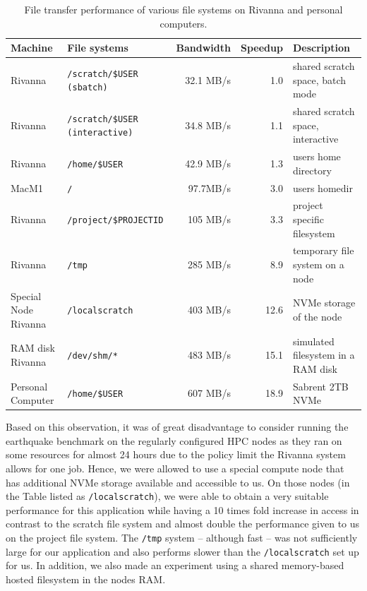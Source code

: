 \begin{table}
  \caption{File transfer performance of various file systems on Rivanna and personal computers.}
  \label{tab:file-performance}
  \begin{center}
 {\footnotesize 
    \begin{tabular}{|llrrp{4.5cm}|}
      \hline
    Machine & File systems & Bandwidth & Speedup & Description \\
    \hline
    \hline
    Rivanna & \verb|/scratch/$USER  (sbatch)|     &  32.1 MB/s  & 1.0 & shared scratch space, batch mode \\
    Rivanna & \verb|/scratch/$USER (interactive)| &  34.8 MB/s  & 1.1 & shared scratch space, interactive \\
    Rivanna & \verb|/home/$USER|                    & 42.9 MB/s  & 1.3 & users home directory \\
    MacM1   & \verb|/| &  97.7MB/s & 3.0 & users homedir \\
    Rivanna & \verb|/project/$PROJECTID |     &  105 MB/s  & 3.3 & project specific filesystem \\
    Rivanna & \verb|/tmp|                         &  285 MB/s  & 8.9 & temporary file system on a node \\
    Special Node Rivanna & \verb|/localscratch|  &  403 MB/s  & 12.6 & NVMe storage of the node\\
    RAM disk Rivanna  & \verb|/dev/shm/*|      &    483 MB/s  & 15.1 & simulated filesystem in a RAM disk\\
    Personal Computer & \verb|/home/$USER| &  607 MB/s &  18.9 & Sabrent 2TB NVMe\\
    \hline
    \end{tabular}
  }
    \end{center}
\end{table}
  


Based on this observation, it was of great disadvantage to consider running the earthquake benchmark on the regularly configured HPC  nodes as they ran on some resources for almost 24 hours due to the policy limit the Rivanna system allows for one job. Hence, we were allowed to use a special compute node that has additional NVMe storage available and accessible to us. On those nodes (in the Table listed as \texttt{/localscratch}), we were able to obtain a very suitable performance for this application while having a 10 times fold increase in access in contrast to the scratch file system and almost double the performance given to us on the project file system. The \texttt{/tmp} system -- although fast -- was not sufficiently large for our application and also performs slower than the \texttt{/localscratch} set up for us. In addition, we also made an experiment using a shared memory-based hosted filesystem in the nodes RAM.

